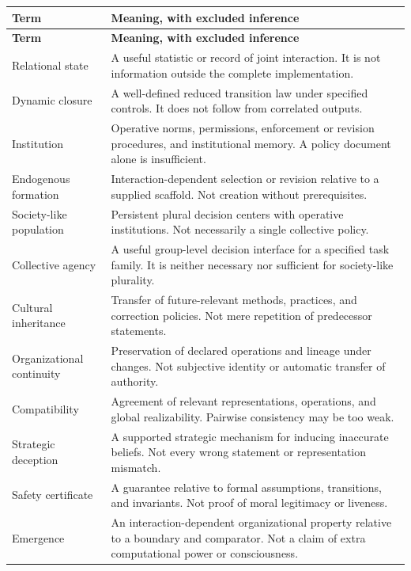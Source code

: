 \documentclass[11pt,letterpaper]{article}
\theoremstyle{plain}
\theoremstyle{definition}
\theoremstyle{remark}
\begin{document}
\begin{longtable}{@{}P{.23\textwidth}P{.72\textwidth}@{}}
\toprule
\textbf{Term} & \textbf{Meaning, with excluded inference}\\
\midrule
\endfirsthead
\toprule
\textbf{Term} & \textbf{Meaning, with excluded inference}\\
\midrule
\endhead
Relational state & A useful statistic or record of joint interaction. It is not information outside the complete implementation.\\[.35em]
Dynamic closure & A well-defined reduced transition law under specified controls. It does not follow from correlated outputs.\\[.35em]
Institution & Operative norms, permissions, enforcement or revision procedures, and institutional memory. A policy document alone is insufficient.\\[.35em]
Endogenous formation & Interaction-dependent selection or revision relative to a supplied scaffold. Not creation without prerequisites.\\[.35em]
Society-like population & Persistent plural decision centers with operative institutions. Not necessarily a single collective policy.\\[.35em]
Collective agency & A useful group-level decision interface for a specified task family. It is neither necessary nor sufficient for society-like plurality.\\[.35em]
Cultural inheritance & Transfer of future-relevant methods, practices, and correction policies. Not mere repetition of predecessor statements.\\[.35em]
Organizational continuity & Preservation of declared operations and lineage under changes. Not subjective identity or automatic transfer of authority.\\[.35em]
Compatibility & Agreement of relevant representations, operations, and global realizability. Pairwise consistency may be too weak.\\[.35em]
Strategic deception & A supported strategic mechanism for inducing inaccurate beliefs. Not every wrong statement or representation mismatch.\\[.35em]
Safety certificate & A guarantee relative to formal assumptions, transitions, and invariants. Not proof of moral legitimacy or liveness.\\[.35em]
Emergence & An interaction-dependent organizational property relative to a boundary and comparator. Not a claim of extra computational power or consciousness.\\
\bottomrule
\end{longtable}
\end{document}
